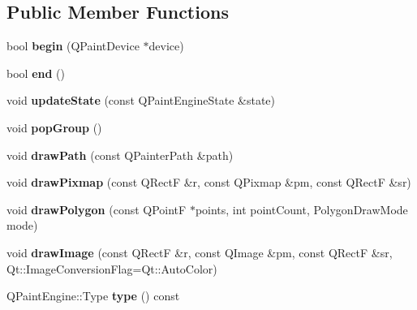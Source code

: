 \subsection*{Public Member Functions}
\begin{DoxyCompactItemize}
\item 
\mbox{\label{class_svg_paint_engine_ac8645354a3c360eca04a1df4861fba1f}} 
bool {\bfseries begin} (Q\+Paint\+Device $\ast$device)
\item 
\mbox{\label{class_svg_paint_engine_a9f19b32d7c19f568ebfdc16c7bae81ac}} 
bool {\bfseries end} ()
\item 
\mbox{\label{class_svg_paint_engine_ae81226c06b9ddde65feaa5c70fae637f}} 
void {\bfseries update\+State} (const Q\+Paint\+Engine\+State \&state)
\item 
\mbox{\label{class_svg_paint_engine_ab3a2261ae8e125e45fb820a2430bd152}} 
void {\bfseries pop\+Group} ()
\item 
\mbox{\label{class_svg_paint_engine_ab0eea2f1c443d26aa3d80c3cab0e7c8d}} 
void {\bfseries draw\+Path} (const Q\+Painter\+Path \&path)
\item 
\mbox{\label{class_svg_paint_engine_af704d14d70b2468d5dc19a0547696ec7}} 
void {\bfseries draw\+Pixmap} (const Q\+RectF \&r, const Q\+Pixmap \&pm, const Q\+RectF \&sr)
\item 
\mbox{\label{class_svg_paint_engine_a23ae71bb4818b9dec5edd4fcf3ea25a5}} 
void {\bfseries draw\+Polygon} (const Q\+PointF $\ast$points, int point\+Count, Polygon\+Draw\+Mode mode)
\item 
\mbox{\label{class_svg_paint_engine_a3099fc7e721a71dd980f93cddd7f1c4e}} 
void {\bfseries draw\+Image} (const Q\+RectF \&r, const Q\+Image \&pm, const Q\+RectF \&sr, Qt\+::\+Image\+Conversion\+Flag=Qt\+::\+Auto\+Color)
\item 
\mbox{\label{class_svg_paint_engine_aef7824de2a11c6431bb788d348b4166f}} 
Q\+Paint\+Engine\+::\+Type {\bfseries type} () const

\end{DoxyCompactItemize}
